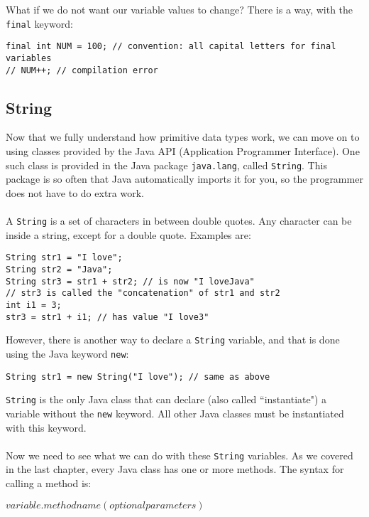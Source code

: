 \noindent What if we do not want our variable values to change? There is a way, with the \verb|final| keyword:
\begin{lstlisting}
final int NUM = 100; // convention: all capital letters for final variables
// NUM++; // compilation error
\end{lstlisting}

\subsection{String}
Now that we fully understand how primitive data types work, we can move on to using classes provided by the Java API (Application Programmer Interface). One such class is provided in the Java package \verb|java.lang|, called \verb|String|. This package is so often that Java automatically imports it for you, so the programmer does not have to do extra work.
\\ \\
A \verb|String| is a set of characters in between double quotes. Any character can be inside a string, except for a double quote. Examples are:
\begin{lstlisting}
String str1 = "I love";
String str2 = "Java";
String str3 = str1 + str2; // is now "I loveJava"
// str3 is called the "concatenation" of str1 and str2
int i1 = 3;
str3 = str1 + i1; // has value "I love3"
\end{lstlisting}

\noindent However, there is another way to declare a \verb|String| variable, and that is done using the Java keyword \verb|new|:
\begin{lstlisting}
String str1 = new String("I love"); // same as above
\end{lstlisting}

\noindent \verb|String| is the only Java class that can declare (also called ``instantiate") a variable without the \verb|new| keyword. All other Java classes must be instantiated with this keyword.
\\ \\
Now we need to see what we can do with these \verb|String| variables. As we covered in the last chapter, every Java class has one or more methods. The syntax for calling a method is:

\begin{center}
$variable.methodname(optional parameters)$
\end{center}

